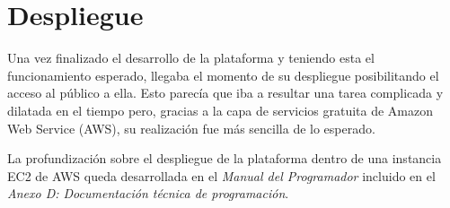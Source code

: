 \section{Despliegue}
Una vez finalizado el desarrollo de la plataforma y teniendo esta el funcionamiento esperado, llegaba el momento de su despliegue posibilitando el acceso al público a ella. Esto parecía que iba a resultar una tarea complicada y dilatada en el tiempo pero, gracias a la capa de servicios gratuita de Amazon Web Service (AWS), su realización fue más sencilla de lo esperado.

La profundización sobre el despliegue de la plataforma dentro de una instancia EC2 de AWS queda desarrollada en el \textit{Manual del Programador} incluido en el \textit{Anexo D: Documentación técnica de programación}.